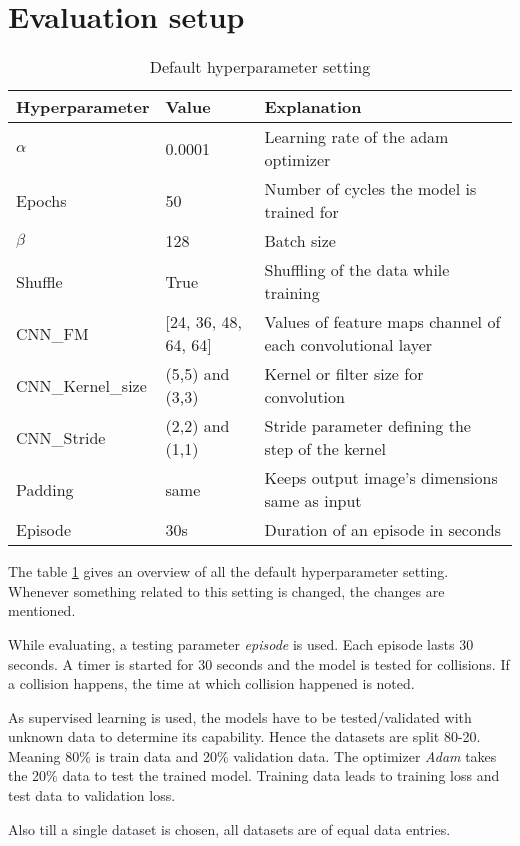 \section*{Evaluation setup}
\begin{table}[t]
    \centering
    \begin{tabular}{lll}
    \toprule
    Hyperparameter & Value & Explanation \\\midrule
      $\alpha$& 0.0001& Learning rate of the adam optimizer \\
      Epochs & 50 & Number of cycles the model is trained for \\
      $\beta$ & 128 & Batch size \\
      Shuffle & True & Shuffling of the data while training \\
        CNN\_FM & [24, 36, 48, 64, 64] & Values of feature maps channel of each
        convolutional layer \\
        CNN\_Kernel\_size &(5,5) and (3,3) & Kernel or filter size for convolution \\
        CNN\_Stride & (2,2) and (1,1) & Stride parameter defining the step of the kernel
        \\
        Padding & same & Keeps output image's dimensions same as input \\
        Episode & 30s & Duration of an episode in seconds
        \\\bottomrule
\end{tabular}
\caption{Default hyperparameter setting}
\label{table:hyperparametersetting}
\end{table}
The table \ref{table:hyperparametersetting} gives an overview of all the default
hyperparameter setting. Whenever something related to this setting is changed, the changes
are mentioned.

While evaluating, a testing parameter \textit{episode} is used. Each episode lasts 30 seconds. A timer is started for 30 seconds and
the  model is tested for collisions. If a collision happens, the time at which collision
happened is noted.

As supervised learning is used, the models have to be tested/validated with unknown data
to determine its capability. Hence the datasets are split 80-20. Meaning 80\% is train
data and 20\% validation data. The optimizer \textit{Adam} takes the 20\% data to test the
trained model. Training data leads to training loss and test data to validation loss.

Also till a single dataset is chosen, all datasets are of equal data entries.

